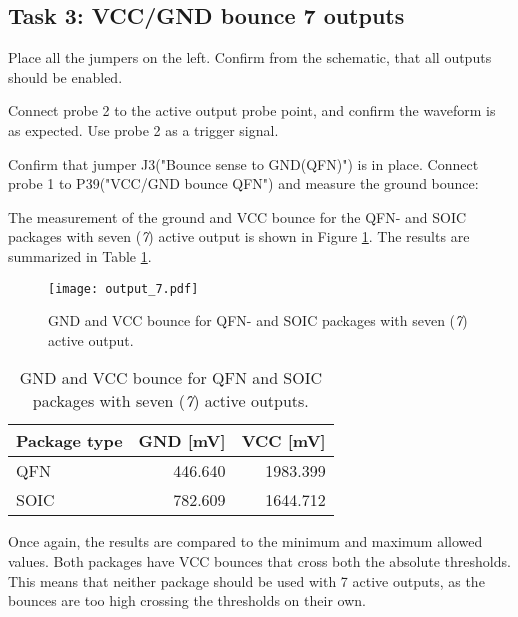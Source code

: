 \documentclass[../main.tex]{subfiles}
\begin{document}
\subsection{Task 3: VCC/GND bounce 7 outputs}

Place all the jumpers on the left. Confirm from the schematic, that all outputs should be enabled.

\vspace{10pt}

Connect probe 2 to the active output probe point, and confirm the waveform is as expected. Use probe 2 as a trigger signal.

\vspace{10pt}

Confirm that jumper J3("Bounce sense to GND(QFN)") is in place. Connect probe 1 to P39("VCC/GND bounce QFN") and measure the ground bounce:

\solution

The measurement of the ground and VCC bounce for the QFN- and SOIC packages with seven (\textit{7}) active output is shown in Figure \ref{fig:gnd_vcc_output_7}. The results are summarized in Table \ref{tab:output_7}.

\begin{figure}[H]
    \centering
    \texttt{[image: output\_7.pdf]}
    \caption{GND and VCC bounce for QFN- and SOIC packages with seven (\textit{7}) active output.}
    \label{fig:gnd_vcc_output_7}
\end{figure}
\begin{table}[H]
    \centering
    \begin{tabular}{l | r r}
        \toprule[1pt]
        Package type    & GND [mV]  & VCC [mV]\\
        \midrule
        QFN             & 446.640   & 1983.399  \\
        SOIC            & 782.609   & 1644.712  \\
        \bottomrule[1pt]
    \end{tabular}
    \caption{GND and VCC bounce for QFN and SOIC packages with seven (\textit{7}) active outputs.}
    \label{tab:output_7}
\end{table}

Once again, the results are compared to the minimum and maximum allowed values. Both packages have VCC bounces that cross both the absolute thresholds. This means that neither package should be used with 7 active outputs, as the bounces are too high crossing the thresholds on their own.
\end{document}
